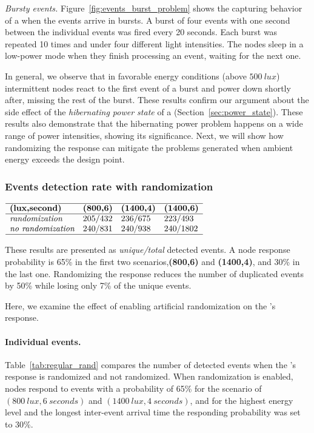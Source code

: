 \textit{Bursty events.}
Figure~\ref{fig:events_burst_problem} shows the capturing behavior of a \cis when the events arrive in bursts. A burst of four events with one second between the individual events was fired every 20 seconds. Each burst was repeated 10 times and under four different light intensities. The nodes sleep in a low-power mode when they finish processing an event, waiting for the next one. 

In general, we observe that in favorable energy conditions (above $\SI{500}{lux}$) intermittent nodes react to the first event of a burst and power down shortly after, missing the rest of the burst. These results confirm our argument about the side effect of the \textit{hibernating power state} of a \cis (Section~\ref{sec:power_state}). These results also demonstrate that the hibernating power problem happens on a wide range of power intensities, showing its significance. Next, we will show how randomizing the response can mitigate the problems generated when ambient energy exceeds the design point. 

\subsubsection{Events detection rate with randomization}
\begin{table}
	\centering
    $
    \begin{array}{llll}\hline
     \textbf{(lux,second)} & \textbf{(800,6)} & \textbf{(1400,4)} & \textbf{(1400,6)}\\\hline
    \textit{randomization}    & 205/432 &  236/675 & 223/493 \\
    \textit{no randomization} & 240/831 &  240/938 & 240/1802 \\\hline
    \end{array}
    $
    \caption{These results are presented as \textit{unique/total} detected events. A node response probability is 65\% in the first two scenarios,\textbf{(800,6)} and \textbf{(1400,4)}, and 30\% in the last one.   
    Randomizing the response reduces the number of duplicated events by 50\% while losing only 7\% of the unique events.}
    \label{tab:regular_rand}
\end{table}
% 
Here, we examine the effect of enabling artificial randomization on the \cis's response. 

\paragraph{Individual events.} 
Table~\ref{tab:regular_rand} compares the number of detected events when the \cim's response is randomized and not randomized.
When randomization is enabled, nodes respond to events with a probability of 65\% for the scenario of $\left(\SI{800}{lux}, \SI{6}{seconds}\right)$ and $\left(\SI{1400}{lux}, \SI{4}{seconds}\right)$, and for the highest energy level and the longest inter-event arrival time the responding probability was set to 30\%.


